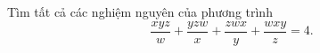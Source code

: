 \ifshowproblem
\begin{problem}\label{example:CHN-2015-NMO-10-P1}
    Tìm tất cả các nghiệm nguyên của phương trình \[ \frac{xyz}{w}+\frac{yzw}{x}+\frac{zwx}{y}+\frac{wxy}{z}=4. \]
\end{problem}
\fi

\footnotemark
{}
\fi